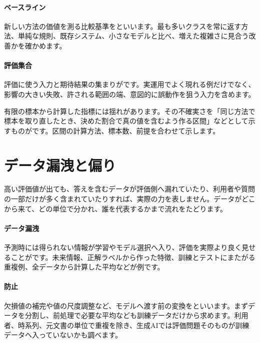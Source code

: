 \paragraph{ベースライン}
        新しい方法の価値を測る比較基準をといいます。最も多いクラスを常に返す方法、単純な規則、既存システム、小さなモデルと比べ、増えた複雑さに見合う改善かを確かめます。

\paragraph{評価集合}
        評価に使う入力と期待結果の集まりがです。実運用でよく現れる例だけでなく、影響の大きい失敗、許される範囲の端、意図的に誤動作を狙う入力を含めます。

        有限の標本から計算した指標には揺れがあります。その不確実さを「同じ方法で標本を取り直したとき、決めた割合で真の値を含むよう作る区間」などとして示すものがです。区間の計算方法、標本数、前提を合わせて示します。

\par
\endgroup
\par
\endgroup


\section{データ漏洩と偏り}
\label{sec:06-machine-learning-32}

高い評価値が出ても、答えを含むデータが評価側へ漏れていたり、利用者や質問の一部だけが多く含まれていたりすれば、実際の力を表しません。データがどこから来て、どの単位で分かれ、誰を代表するかまで流れをたどります。

\begingroup
\begingroup
\paragraph{データ漏洩}
        予測時には得られない情報が学習やモデル選択へ入り、評価を実際より良く見せることがです。未来情報、正解ラベルから作った特徴、訓練とテストにまたがる重複例、全データから計算した平均などが例です。

\paragraph{防止}
        欠損値の補完や値の尺度調整など、モデルへ渡す前の変換をといいます。まずデータを分割し、前処理で必要な平均なども訓練データだけから求めます。利用者、時系列、元文書の単位で重複を除き、生成AIでは評価問題そのものが訓練データへ入っていないかも調べます。

